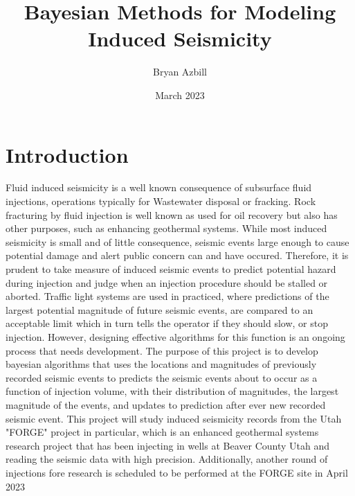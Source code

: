 \documentclass{article}
\title{Bayesian Methods for Modeling Induced Seismicity}
\author{Bryan Azbill}
\date{March 2023}
\begin{document}
\maketitle
\section{Introduction}
    Fluid induced seismicity is a well known consequence of subsurface fluid injections, operations typically for Wastewater disposal or fracking.   
    Rock fracturing by fluid injection is well known as used for oil recovery but also has other purposes, such as enhancing geothermal systems.
    While most induced seismicity is small and of little consequence, seismic events large enough to cause potential damage and alert public concern
    can and have occured. Therefore, it is prudent to take measure of induced seismic events to predict potential  hazard during     
    injection and judge when an injection procedure should be stalled or aborted.\cite{BibEntry2018Mar}
    Traffic light systems are used in practiced, where predictions of the largest potential magnitude of future seismic events, are compared  
    to an acceptable limit which in turn tells the operator if they should slow, or stop injection. However, designing effective algorithms for this function is an 
    ongoing process that needs development.\cite{Mignan2017Oct} The purpose of this project is to  develop  bayesian algorithms that uses the locations and magnitudes of
    previously recorded seismic events to predicts the  seismic events about to occur as a function of injection volume, with their distribution of magnitudes, 
    the largest magnitude of the events, and updates to prediction after ever new recorded seismic event. This project will study induced seismicity records from 
    the Utah "FORGE" project in particular, which is an enhanced geothermal systems research project that has been injecting in wells at Beaver County Utah and reading the seismic data
    with high precision. Additionally, another round of injections fore research is scheduled to be performed at the FORGE site in  April 2023
\end{document}
